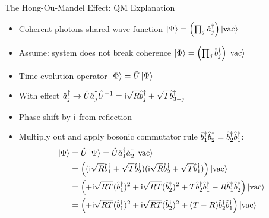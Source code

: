 \begin{frame}[t]{The Hong-Ou-Mandel Effect: QM Explanation}
%
\begin{itemize}
\item Coherent photons \Thus shared wave function
	\tabto{7cm} $ \ketIn  = \qty( \prod_j \cre[a]_j ) \vac $
\item Assume: system does not break coherence
	\tabto{7cm} $ \ketOut = \qty( \prod_j \cre[b]_j ) \vac $
\item	Time evolution operator
	\tabto{7cm} $ \ketOut = \opU \ketIn $
\item With effect
	\tabto{7cm} $ \cre_j \to \opU \cre_j \opU^{-1} = \iunit \sqrt{R} \cre[b]_j + \sqrt{T} \cre[b]_{3-j} $
\item Phase shift by $\iunit$ from reflection
\item Multiply out and apply bosonic commutator rule $\cre[b]_1 \cre[b]_2 = \cre[b]_2 \cre[b]_1$:
	\begin{align*}
		\textstyle
		\ketOut
	&=
		\opU \ketIn = \opU \cre_1 \cre_2 \vac \\
	&=
		\qty(
			(\iunit \sqrt{R} \cre[b]_1 + \sqrt{T} \cre[b]_2)
			(\iunit \sqrt{R} \cre[b]_2 + \sqrt{T} \cre[b]_1)
		) \vac \\
	&=
		\qty(
			+ \iunit \sqrt{RT} (\cre[b]_1)^2
			+ \iunit \sqrt{RT} (\cre[b]_2)^2
			+ T \cre[b]_2 \cre[b]_1
			- R \cre[b]_1 \cre[b]_2
		) \vac \\
	&=
		\qty(
			+ \iunit \sqrt{RT} (\cre[b]_1)^2
			+ \iunit \sqrt{RT} (\cre[b]_2)^2
			+ (T - R) \cre[b]_2 \cre[b]_1
		) \vac
	\end{align*}
\end{itemize}
%
\end{frame}


